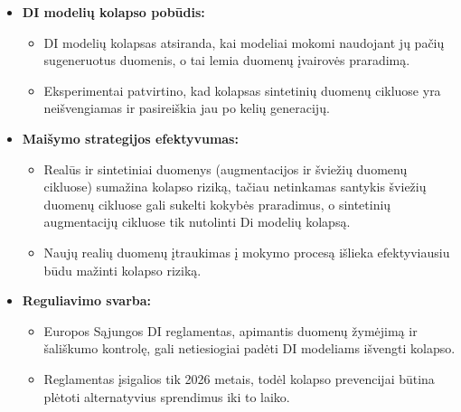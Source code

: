 \documentclass{VUMIFInfKursinis}
\begin{document}



\begin{itemize}
    \item \textbf{DI modelių kolapso pobūdis:}
    \begin{itemize}
        \item DI modelių kolapsas atsiranda, kai modeliai mokomi naudojant jų pačių sugeneruotus duomenis, o tai lemia duomenų įvairovės praradimą.
        \item Eksperimentai patvirtino, kad kolapsas sintetinių duomenų cikluose yra neišvengiamas ir pasireiškia jau po kelių generacijų.
    \end{itemize}
    \item \textbf{Maišymo strategijos efektyvumas:}
    \begin{itemize}
        \item Realūs ir sintetiniai duomenys (augmentacijos ir šviežių duomenų cikluose) sumažina kolapso riziką, tačiau netinkamas santykis šviežių duomenų cikluose gali sukelti kokybės praradimus, o sintetinių augmentacijų cikluose tik nutolinti Di modelių kolapsą.
        \item Naujų realių duomenų įtraukimas į mokymo procesą išlieka efektyviausiu būdu mažinti kolapso riziką.
    \end{itemize}
    \item \textbf{Reguliavimo svarba:}
    \begin{itemize}
        \item Europos Sąjungos DI reglamentas, apimantis duomenų žymėjimą ir šališkumo kontrolę, gali netiesiogiai padėti DI modeliams išvengti kolapso.
        \item Reglamentas įsigalios tik 2026 metais, todėl kolapso prevencijai būtina plėtoti alternatyvius sprendimus iki to laiko.
    \end{itemize}
\end{itemize}
\end{document}
